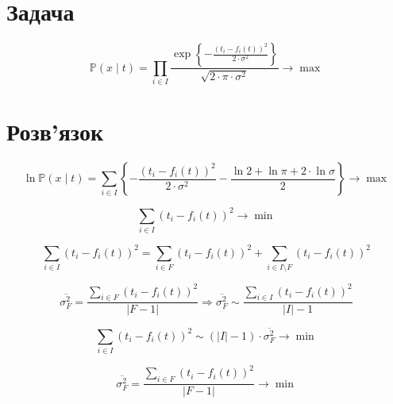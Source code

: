 \section{Задача}

\begin{equation*}
  \mathbb{P}\left( x \mid t \right)
  = \prod_{i \in I}
    \frac{\exp{\left\{- \frac{\left( t_i - f_i\left( t \right) \right)^2}
         {2 \cdot \sigma^2} \right\}}}{\sqrt{2 \cdot \pi \cdot \sigma^2}}
  \to \max
\end{equation*}

\section{Розв'язок}

\begin{equation*}
  \ln{\mathbb{P}\left( x \mid t \right)}
  = \sum_{i \in I}
    \left\{
      - \frac{\left( t_i - f_i\left( t \right) \right)^2}{2 \cdot \sigma^2}
      - \frac{\ln{2} + \ln{\pi} + 2 \cdot \ln{\sigma}}{2}
    \right\}
  \to \max
\end{equation*}

\begin{equation*}
  \sum_{i \in I} \left( t_i - f_i\left( t \right) \right)^2 \to \min
\end{equation*}

\begin{equation*}
  \sum_{i \in I} \left( t_i - f_i\left( t \right) \right)^2
  = \sum_{i \in F} \left( t_i - f_i\left( t \right) \right)^2
  + \sum_{i \in I \setminus F} \left( t_i - f_i\left( t \right) \right)^2
\end{equation*}

\begin{equation*}
    \overline{\sigma_F^2}
    = \frac{\sum\limits_{i \in F} \left( t_i - f_i\left( t \right) \right)^2}
           {\left| F - 1 \right|}
    \Rightarrow
    \overline{\sigma_F^2}
    \sim \frac{\sum\limits_{i \in I}
                 \left( t_i - f_i\left( t \right) \right)^2}
               {\left| I \right| - 1}
\end{equation*}

\begin{equation*}
  \sum_{i \in I} \left( t_i - f_i\left( t \right) \right)^2
  \sim \left( \left| I \right| - 1 \right) \cdot \overline{\sigma_F^2}
  \to \min
\end{equation*}

\begin{equation*}
  \overline{\sigma_F^2}
  = \frac{\sum\limits_{i \in F} \left( t_i - f_i\left( t \right) \right)^2}
         {\left| F - 1 \right|}
  \to \min
\end{equation*}
